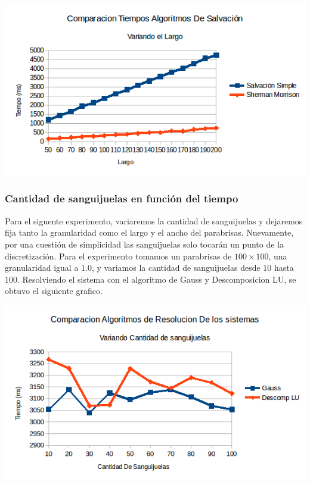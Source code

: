 \begin{center}
 \includegraphics[width=400pt]{imagenes/testeo/largoSalv.png}
\end{center}

\explicar
\subsubsection{Cantidad de sanguijuelas en función del tiempo}
Para el siguente experimento, variaremos la cantidad de sanguijuelas y dejaremos fija tanto la granularidad como el largo y el ancho del parabrisas. Nuevamente, por una cuestión de simplicidad las sanguijuelas solo tocarán un punto de la discretización. Para el experimento tomamos un parabrisas de $100 \times 100$, una granularidad igual a $1.0$, y variamos la cantidad de sanguijuelas desde $10$ hasta $100$. Resolviendo el sistema con el algoritmo de Gauss y Descomposicion LU, se obtuvo el siguiente grafico.

\begin{center}
 \includegraphics[width=400pt]{imagenes/testeo/sangGauss.png}
\end{center}

